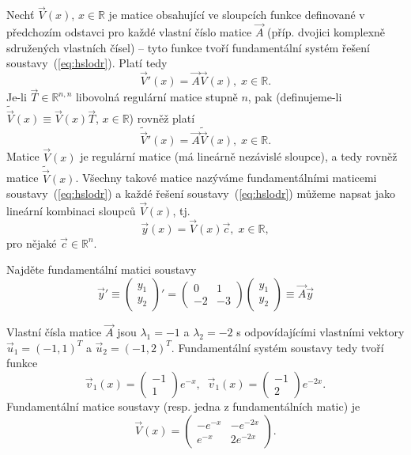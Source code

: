 Nechť $\vec{V}(x)$, $x\in\mathbb{R}$ je matice obsahující ve sloupcích funkce definované v předchozím odstavci
pro každé vlastní číslo matice $\vec{A}$ (příp. dvojici komplexně sdružených vlastních čísel)
-- tyto funkce tvoří fundamentální systém řešení soustavy~(\ref{eq:hslodr}).
Platí tedy
\[
   \vec{V}'(x) = \vec{A}\vec{V}(x), \; x\in\mathbb{R}.
\]
Je-li $\vec{T}\in\mathbb{R}^{n,n}$ libovolná regulární matice stupně $n$, pak 
(definujeme-li $\tilde{\vec{V}}(x)\equiv\vec{V}(x)\vec{T}$, $x\in\mathbb{R}$) rovněž platí
\[
   \tilde{\vec{V}}'(x) = \vec{A}\tilde{\vec{V}}(x), \; x\in\mathbb{R}.
\]
Matice $\vec{V}(x)$ je regulární matice (má lineárně nezávislé sloupce), a tedy
rovněž matice $\tilde{\vec{V}}(x)$.
Všechny takové matice nazýváme fundamentálními maticemi soustavy~(\ref{eq:hslodr})
a každé řešení soustavy~(\ref{eq:hslodr}) můžeme napsat jako lineární kombinaci sloupců
$\vec{V}(x)$, tj. 
\[
   \vec{y}(x) = \vec{V}(x)\vec{c}, \; x\in\mathbb{R},
\]
pro nějaké $\vec{c}\in\mathbb{R}^{n}$.

\begin{ex}\label{priklad:1}
   Najděte fundamentální matici soustavy
   \[
      \vec{y}'\equiv
      \begin{pmatrix}
         y_1\\y_2
      \end{pmatrix}'
      =
      \begin{pmatrix}
         0 & 1 \\ -2 & -3
      \end{pmatrix}
      \begin{pmatrix}
         y_1\\y_2
      \end{pmatrix}
      \equiv \vec{A}\vec{y}
   \]
\end{ex}
\begin{sol}
   Vlastní čísla matice $\vec{A}$ jsou $\lambda_1=-1$ a $\lambda_2=-2$
   s odpovídajícími vlastními vektory $\vec{u}_1=(-1,1)^T$ a $\vec{u}_2=(-1,2)^T$.
   Fundamentální systém soustavy tedy tvoří funkce
   \[
      \vec{v}_1(x) = \begin{pmatrix}
         -1 \\ 1
      \end{pmatrix}e^{-x}, \;\;
      \vec{v}_1(x) = \begin{pmatrix}
         -1 \\ 2
      \end{pmatrix}e^{-2x}.
   \]
   Fundamentální matice soustavy (resp. jedna z fundamentálních matic) je
   \[
      \vec{V}(x) = \begin{pmatrix}
         -e^{-x} &  -e^{-2x}\\
          e^{-x} &  2e^{-2x}
      \end{pmatrix}.
   \]
\end{sol}


